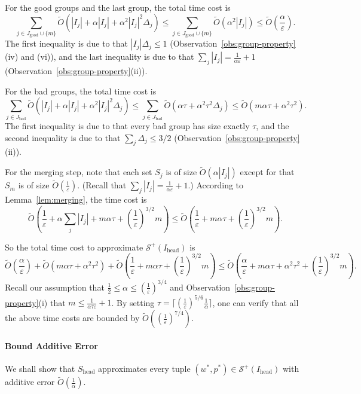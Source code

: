 \documentclass[a4paper,UKenglish,cleveref, autoref, thm-restate, pdfa]{lipics-v2021}
\newcommand{\eps}{\varepsilon}
\renewcommand{\leq}{\leqslant}
\begin{document}
For the good groups and the last group, the total time cost is
\[
    \sum_{j \in J_{\mathrm{good}} \cup \{m\}} \tilde{O}(|I_j| + \alpha|I_j| + \alpha^2|I_j|^2\Delta_j) \leq \sum_{j \in J_{\mathrm{good}}\cup\{m\}}\tilde{O}( \alpha^2|I_j|)  \leq \tilde{O}( \frac{\alpha}{\eps}).
\]
The first inequality is due to that $|I_j|\Delta_j \leq 1$ (Observation~\ref{obs:group-property}(iv) and (vi)), and the last inequality is due to that $\sum_{j}|I_j| = \frac{1}{\alpha\eps} + 1$ (Observation~\ref{obs:group-property}(ii)).

For the bad groups, the total time cost is
\[
    \sum_{j \in J_{\mathrm{bad}}} \tilde{O}(|I_j| + \alpha|I_j| + \alpha^2|I_j|^2\Delta_j) \leq \sum_{j \in J_{\mathrm{bad}}} \tilde{O}(\alpha\tau + \alpha^2\tau^2\Delta_j) \leq \tilde{O}(m\alpha\tau + \alpha^2\tau^2).
\] 
The first inequality is due to that every bad group has size exactly $\tau$, and the second inequality is due to that $\sum_{j}\Delta_j \leq 3/2$ (Observation~\ref{obs:group-property}(ii)).

For the merging step, note that each set $S_j$ is of size $\tilde{O}(\alpha|I_j|)$ except for that $S_m$ is of size $\tilde{O}(\frac{1}{\eps})$. (Recall that $\sum_{j}|I_j| = \frac{1}{\alpha\eps} + 1$.) According to Lemma~\ref{lem:merging}, the time cost  is
\[
    \tilde{O}(\frac{1}{\eps} + \alpha\sum_j|I_j| + m\alpha\tau + (\frac{1}{\eps})^{3/2}m) \leq \tilde{O}(\frac{1}{\eps} + m\alpha\tau + (\frac{1}{\eps})^{3/2}m).
\]

So the total time cost to approximate $\mathcal{S}^+(I_{\mathrm{head}})$ is 
\[
    \tilde{O}(\frac{\alpha}{\eps}) + \tilde{O}(m\alpha\tau + \alpha^2\tau^2) +  \tilde{O}(\frac{1}{\eps} + m\alpha\tau + (\frac{1}{\eps})^{3/2}m)\leq \tilde{O}(\frac{\alpha}{\eps}+m\alpha\tau+\alpha^2\tau^2+(\frac{1}{\eps})^{3/2}m).
\]
Recall our assumption that $\frac{1}{2}\leq \alpha \leq (\frac{1}{\eps})^{3/4}$ and Observation~\ref{obs:group-property}(i) that $m \leq \frac{1}{\alpha\tau\eps} + 1$. By setting $\tau = \lceil (\frac{1}{\eps})^{5/6}\frac{1}{\alpha}\rceil$, one can verify that all the above time costs are bounded by $\tilde{O}((\frac{1}{\eps})^{7/4})$.

\paragraph*{Bound Additive Error}
We shall show that $S_{\mathrm{head}}$ approximates every tuple $(w^*, p^*) \in \mathcal{S}^+(I_{\mathrm{head}})$ with additive error $\tilde{O}(\frac{1}{\alpha})$. 
\end{document}
